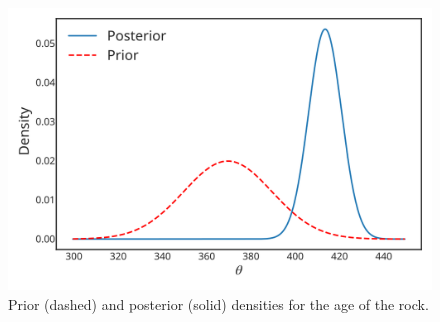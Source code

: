 {\begin{figure}[ht]
\includegraphics{images/priorposterior4.svg}
\caption{Prior (dashed) and posterior (solid) densities for the age of the rock.}


\end{figure}}








































































